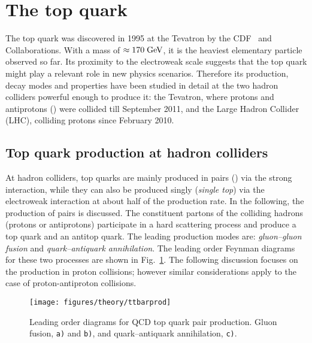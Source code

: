 \section{The top quark}
\label{sec:topquark}

The top quark was discovered in 1995 at the Tevatron by the
CDF~\cite{topcdf} and \dzero{}~\cite{topdzero} Collaborations. With a
mass of $\approx{}170\; \mathrm{GeV}{}$, it is the heaviest elementary particle
observed so far. Its proximity to the electroweak scale suggests that
the top quark might play a relevant role in new physics
scenarios. Therefore its production, decay modes and properties have
been studied in detail at the two hadron colliders powerful 
enough to produce it: the Tevatron, where protons and antiprotons (\ppbar{}) were
collided till September 2011, and the Large Hadron Collider (LHC),
colliding protons since February 2010.

\subsection{Top quark production at hadron colliders}
\label{sec:topprod}

At hadron colliders, top quarks are mainly produced in pairs
(\ttbar{}) via the strong interaction, while they can also be produced
singly ({\it single top}) via the electroweak interaction at about
half of the \ttbar{} production rate. In the following, the production
of \ttbar{} pairs is discussed. The constituent partons of the
colliding hadrons (protons or antiprotons) participate in a hard
scattering process and produce a top quark and an antitop quark. The
leading production modes are: {\it gluon--gluon fusion} and {\it
  quark--antiquark annihilation}. The leading order Feynman diagrams
for these two processes are shown in Fig.~\ref{fig:ttbarprod}. The
following discussion focuses on the \ttbar{} production in proton
collisions; however similar considerations apply to the case of
proton-antiproton collisions.

\begin{figure}[!htb]\centering
  \texttt{[image: figures/theory/ttbarprod]}
  \caption{Leading order diagrams for QCD top quark pair production.
    Gluon fusion, {\tt a)} and {\tt b)}, and  quark--antiquark
    annihilation, {\tt c)}.}
  \label{fig:ttbarprod}
\end{figure}

